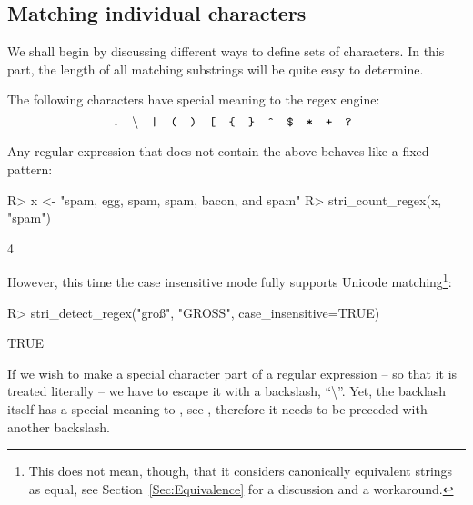 \documentclass[nojss]{jss}\usepackage[]{graphicx}\usepackage[]{color}
\begin{document}
\subsection{Matching individual characters}\label{Sec:RegexIndividualChars}

We shall begin by discussing different ways to define sets of characters.
In this part, the length of all matching substrings will be quite
easy to determine.

The following characters have special
meaning to the regex engine:
\[
\text{
  \texttt{.}\quad
  \textbackslash{}\quad
  \texttt{|}\quad
  \texttt{(}\quad
  \texttt{)}\quad
  \texttt{[}\quad
  \texttt{\{}\quad
  \texttt{\}}\quad
  \texttt{\^{}}\quad
  \texttt{\$}\quad
  \texttt{*}\quad
  \texttt{+}\quad
  \texttt{?}\quad
}
\]

Any regular expression that does not contain the above
behaves like a fixed pattern:

\begin{Schunk}
\begin{Sinput}
R> x <- "spam, egg, spam, spam, bacon, and spam"
R> stri_count_regex(x, "spam")
\end{Sinput}
\begin{Soutput}
[1] 4
\end{Soutput}
\end{Schunk}

However, this time the case insensitive mode fully
supports Unicode matching\footnote{%
This does not mean, though, that it considers canonically
equivalent strings as equal,
see Section~\ref{Sec:Equivalence} for a discussion and a workaround.}:

\begin{Schunk}
\begin{Sinput}
R> stri_detect_regex("groß", "GROSS", case_insensitive=TRUE)
\end{Sinput}
\begin{Soutput}
[1] TRUE
\end{Soutput}
\end{Schunk}

If we wish to make a special character part of a regular expression --
so that it is treated literally -- we have to escape it with  a backslash,
``\textbackslash''. Yet, the backlash itself
has a special meaning to , see ,
therefore it needs to be preceded with another backslash.
\end{document}
